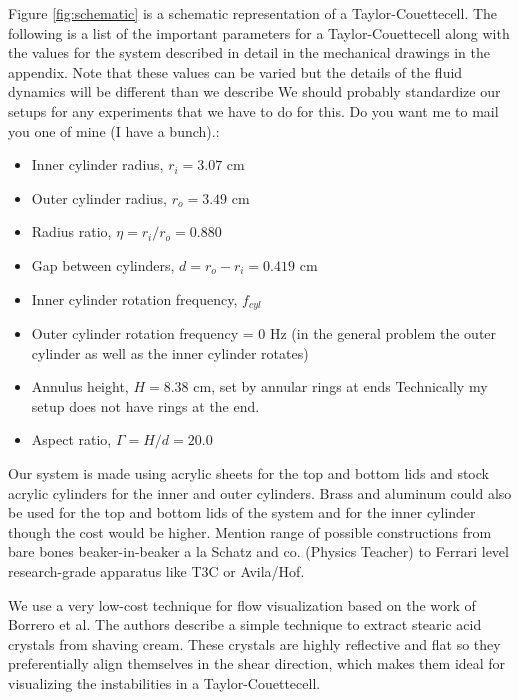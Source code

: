\documentclass[%
reprint,
 amsmath,amssymb,
 aps,
prb,
floatfix,
longbibliography,
notitlepage
]{revtex4-1}
\newcommand{\DB}[1]{{\color{red}#1}} %
\newcommand{\TC}{Taylor-Couette}
\newcommand{\gap}{\ensuremath{d}} %
\newcommand{\height}{\ensuremath{H}} %
\newcommand{\rad}[1]{\ensuremath{r_{#1}}} %
\newcommand{\rratio}{\ensuremath{\eta}} %
\newcommand{\aratio}{\ensuremath{\Gamma}} %
\begin{document}
Figure \ref{fig:schematic} is a schematic representation of a \TC cell. The following is a list of the important parameters for a \TC cell along with the values for the system described in detail in the mechanical drawings in the appendix. Note that these values can be varied but the details of the fluid dynamics will be different than we describe \DB{We should probably standardize our setups for any experiments that we have to do for this. Do you want me to mail you one of mine (I have a bunch).}:
\begin{itemize}
\item Inner cylinder radius, $\rad{i} = 3.07$ cm
\item Outer cylinder radius, $\rad{o} = 3.49$ cm
\item Radius ratio, $\rratio = \rad{i}/\rad{o} = 0.880 $
\item Gap between cylinders, $\gap = \rad{o}-\rad{i} = 0.419$ cm
\item Inner cylinder rotation frequency, $f_{cyl}$
\item Outer cylinder rotation frequency = 0 Hz (in the general problem the outer cylinder as well as the inner cylinder rotates)
\item Annulus height, $\height= 8.38$ cm, set by annular rings at ends \DB{Technically my setup does not have rings at the end.}
\item Aspect ratio, $\aratio=\height/\gap = 20.0$

\end{itemize}
Our system is made using acrylic sheets for the top and bottom lids and stock acrylic cylinders for the inner and outer cylinders. Brass and aluminum could also be used for the top and bottom lids of the system and for the inner cylinder though the cost would be higher. \DB{Mention range of possible constructions from bare bones beaker-in-beaker a la Schatz and co. (Physics Teacher) to Ferrari level research-grade apparatus like T3C or Avila/Hof.}

We use a very low-cost technique for flow visualization based on the work of Borrero et al.\cite{borrero_2018} The authors describe a simple technique to extract stearic acid crystals from shaving cream. These crystals are highly reflective and flat so they preferentially align themselves in the shear direction, which makes them ideal for visualizing the instabilities in a \TC cell.
\end{document}
